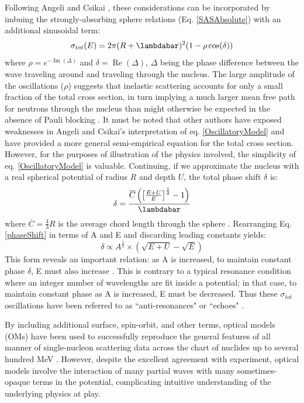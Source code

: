 \documentclass[twocolumn,secnumarabic,amssymb, nobibnotes, aps, prl,
superscriptaddress, nobalancelastpage]{revtex4}
\newcommand{\tots}{\ensuremath{\sigma_{tot}}\,\,}
\newcommand{\totE}{\ensuremath{\sigma_{tot}}(E)}
\begin{document}
Following Angeli and Csikai \cite{Angeli1970}, these considerations can be incorporated by
imbuing the strongly-absorbing sphere relations (Eq. \ref{SASAbsolute}) with an additional sinusoidal term:
\begin{equation} \label{OscillatoryModel}
    \totE = 2\pi (R+\lambdabar)^{2}(1 - \rho \cos(\delta))
\end{equation}
where $\rho = e^{-\operatorname{Im}(\Delta)}$ and $\delta =
\operatorname{Re}(\Delta)$, $\Delta$ being the phase difference between the wave traveling
around and traveling through the nucleus. The large amplitude of the
oscillations ($\rho$) suggests that inelastic scattering accounts for only a small fraction of the total cross section, in turn implying a 
much larger mean free path for neutrons through the nucleus 
than might otherwise be expected in the absence of Pauli blocking
\cite{Mohr1955}. It must be noted that other authors \cite{Ahmad1973} have
exposed weaknesses in Angeli and Csikai's interpretation of
eq. \ref{OscillatoryModel} and have provided a more general semi-empirical
equation for the total cross section. However, for the purposes of illustration
of the physics involved, the simplicity of eq. \ref{OscillatoryModel} is valuable.
Continuing, if we approximate the nucleus with a
real spherical potential of radius $R$ and depth $U$, the total phase shift $\delta$ is:
\begin{equation} \label{phaseShift}
    \delta =
    \frac{\overline{C}\left(\left[{\frac{E+U}{E}}\right]^{\frac{1}{2}}-1\right)}{\lambdabar}
\end{equation}
where $\overline{C} = \frac{4}{3}R$ is the average chord length through the
sphere \cite{Angeli1970}. Rearranging Eq. \ref{phaseShift} in terms of A and E and
discarding leading constants yields:
\begin{equation}
    \delta \propto A^{\frac{1}{3}}\times\left(\sqrt{E+U}-\sqrt{E}\right)
\end{equation}
This form reveals an important relation: as A is increased, to maintain constant 
phase $\delta$, E must also increase \cite{Satchler1980, Peterson1962}. 
This is contrary to a typical resonance condition where an integer number of wavelengths
are fit inside a potential; in that case, to maintain constant phase as A is increased,
E must be decreased. Thus these \tots oscillations have been referred to as
``anti-resonances" or ``echoes" \cite{Satchler1980, McVoy1967}.

By including additional surface, spin-orbit, and other terms, optical models (OMs) have been 
used to successfully reproduce the general features of all manner of single-nucleon scattering 
data across the chart of nuclides up to several hundred MeV \cite{Perey1976,  CH89}. 
However, despite the excellent agreement with experiment, optical models
involve the interaction of many partial waves with many sometimes-opaque terms
in the potential, complicating intuitive understanding of the underlying
physics at play.
\end{document}
